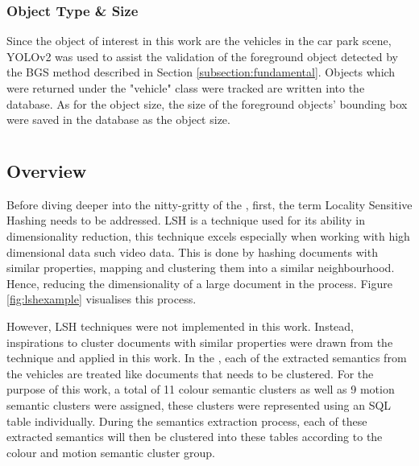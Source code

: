 \subsubsection{Object Type \& Size}
\label{objecttype}
Since the object of interest in this work are the vehicles in the car park scene, YOLOv2 was used to assist the validation of the foreground object detected by the BGS method described in Section \ref{subsection:fundamental}. Objects which were returned under the "vehicle" class were tracked are written into the database. As for the object size, the size of the foreground objects' bounding box were saved in the database as the object size.


\section{\versionOneExt }
\label{section:semantic_lsh}

\subsection{Overview}
Before diving deeper into the nitty-gritty of the \versionOneExt, first, the term Locality Sensitive Hashing needs to be addressed. LSH is a technique used for its ability in dimensionality reduction, this technique excels especially when working with high dimensional data such video data.
This is done by hashing documents with similar properties, mapping and clustering them into a similar neighbourhood. Hence, reducing the dimensionality of a large document in the process. Figure \ref{fig:lshexample} visualises this process.

However, LSH techniques were not implemented in this work. Instead, inspirations to cluster documents with similar properties were drawn from the technique and applied in this work.
In the \versionOneExt, each of the extracted semantics from the vehicles are treated like documents that needs to be  clustered. For the purpose of this work, a total of 11 colour semantic clusters as well as 9 motion semantic clusters were assigned, these clusters were represented using an SQL table individually.
During the semantics extraction process, each of these extracted semantics will then be clustered into these tables according to the colour and motion semantic cluster group.



